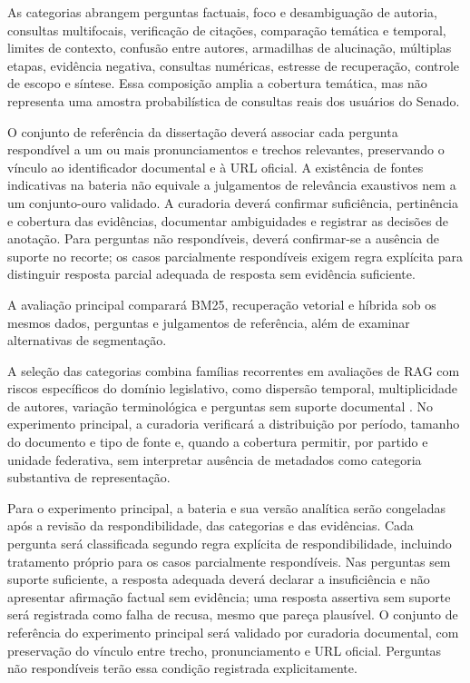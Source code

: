 
As categorias abrangem perguntas factuais, foco e desambiguação de autoria, consultas multifocais, verificação de citações, comparação temática e temporal, limites de contexto, confusão entre autores, armadilhas de alucinação, múltiplas etapas, evidência negativa, consultas numéricas, estresse de recuperação, controle de escopo e síntese. Essa composição amplia a cobertura temática, mas não representa uma amostra probabilística de consultas reais dos usuários do Senado.

O conjunto de referência da dissertação deverá associar cada pergunta respondível a um ou mais pronunciamentos e trechos relevantes, preservando o vínculo ao identificador documental e à URL oficial. A existência de fontes indicativas na bateria não equivale a julgamentos de relevância exaustivos nem a um conjunto-ouro validado. A curadoria deverá confirmar suficiência, pertinência e cobertura das evidências, documentar ambiguidades e registrar as decisões de anotação. Para perguntas não respondíveis, deverá confirmar-se a ausência de suporte no recorte; os casos parcialmente respondíveis exigem regra explícita para distinguir resposta parcial adequada de resposta sem evidência suficiente.

A avaliação principal comparará BM25, recuperação vetorial e híbrida sob os mesmos dados, perguntas e julgamentos de referência, além de examinar alternativas de segmentação.

A seleção das categorias combina famílias recorrentes em avaliações de RAG com riscos específicos do domínio legislativo, como dispersão temporal, multiplicidade de autores, variação terminológica e perguntas sem suporte documental \parencite{zhuEtAl2025rageval,saadFalconEtAl2024ares,esEtAl2023ragas,pipitoneAlami2024legalbenchRag,dahlEtAl2024largeLegalFictions}. No experimento principal, a curadoria verificará a distribuição por período, tamanho do documento e tipo de fonte e, quando a cobertura permitir, por partido e unidade federativa, sem interpretar ausência de metadados como categoria substantiva de representação.

Para o experimento principal, a bateria e sua versão analítica serão congeladas após a revisão da respondibilidade, das categorias e das evidências. Cada pergunta será classificada segundo regra explícita de respondibilidade, incluindo tratamento próprio para os casos parcialmente respondíveis. Nas perguntas sem suporte suficiente, a resposta adequada deverá declarar a insuficiência e não apresentar afirmação factual sem evidência; uma resposta assertiva sem suporte será registrada como falha de recusa, mesmo que pareça plausível. O conjunto de referência do experimento principal será validado por curadoria documental, com preservação do vínculo entre trecho, pronunciamento e URL oficial. Perguntas não respondíveis terão essa condição registrada explicitamente.

